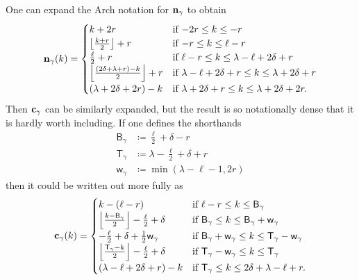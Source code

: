 \begin{remark}
  One can expand the Arch notation for $\mathbf n_\gamma$ to obtain
  \[
    \mathbf n_\gamma(k) =
    \begin{cases}
      k + 2r & \text{if } {-2r} \le k \le -r \\
      \left\lfloor \frac{k+r}{2} \right\rfloor + r & \text{if }{-r} \le k \le \ell-r \\
      \frac{\ell}{2} + r & \text{if } \ell - r \le k \le \lambda - \ell + 2\delta +  r \\
      \left\lfloor \frac{(2\delta+\lambda+r)-k}{2} \right\rfloor + r & \text{if } \lambda - \ell + 2\delta + r \le k \le \lambda + 2\delta + r \\
      (\lambda + 2\delta + 2r) - k & \text{if } \lambda + 2\delta + r \le k \le \lambda + 2\delta + 2r.
    \end{cases}
  \]
  Then $\mathbf c_\gamma$ can be similarly expanded, but the result is so notationally dense
  that it is hardly worth including.
  If one defines the shorthands
  \begin{align*}
    \mathsf{B}_\gamma &\coloneqq \frac{\ell}{2} + \delta - r \\
    \mathsf{T}_\gamma &\coloneqq \lambda - \frac{\ell}{2} + \delta + r \\
    \mathsf{w}_\gamma &\coloneqq \min(\lambda-\ell-1, 2r)
  \end{align*}
  then it could be written out more fully as
  \[
    \mathbf c_\gamma(k) = \begin{cases}
      k - (\ell - r)
        & \text{if } \ell-r \le k \le \mathsf{B}_\gamma \\
      \left\lfloor \frac{k - \mathsf{B}_\gamma}{2} \right\rfloor - \frac{\ell}{2} + \delta
        &\text{if } \mathsf{B}_\gamma \le k \le \mathsf{B}_\gamma + \mathsf{w}_\gamma \\
      - \frac{\ell}{2} + \delta + \frac{1}{2} \mathsf{w}_\gamma
        &\text{if } \mathsf{B}_\gamma + \mathsf{w}_\gamma \le k \le \mathsf{T}_\gamma - \mathsf{w}_\gamma \\
      \left\lfloor \frac{\mathsf{T}_\gamma - k}{2} \right\rfloor - \frac{\ell}{2} + \delta
        &\text{if } \mathsf{T}_\gamma - \mathsf{w}_\gamma \le k \le \mathsf{T}_\gamma \\
        (\lambda - \ell + 2\delta + r) - k
        & \text{if } \mathsf{T}_\gamma \le k \le 2\delta + \lambda - \ell + r.
    \end{cases}
  \]
\end{remark}


